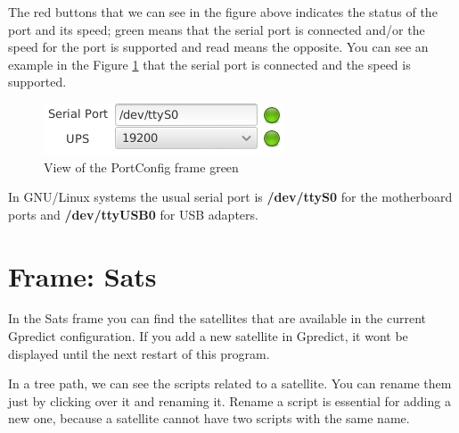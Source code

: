 \documentclass[pdftex,11pt,a4paper,titlepage]{report}
\begin{document}
The red buttons that we can see in the figure above indicates the status of the port and its speed; green means that the serial port is connected and/or the speed for the port is supported and read means the opposite. You can see an example in the Figure \ref{PortConfigFrameGreen} that the serial port is connected and the speed is supported.

\begin{figure}[h]
\centering
\includegraphics[scale=0.9]{../images/PortConfigFrameGreen.png}
\caption{View of the PortConfig frame green}
\label{PortConfigFrameGreen}
\end{figure}

In GNU/Linux systems the usual serial port is \textbf{/dev/ttyS0} for the motherboard ports and \textbf{/dev/ttyUSB0} for USB adapters. 

\chapter{Frame: Sats}
\hspace{0.4cm} In the Sats frame you can find the satellites that are available in the current Gpredict configuration. If you add a new satellite in Gpredict, it wont be displayed until the next restart of this program.

In a tree path, we can see the scripts related to a satellite. You can rename them just by clicking over it and renaming it. Rename a script is essential for adding a new one, because a satellite cannot have two scripts with the same name. 
\end{document}
